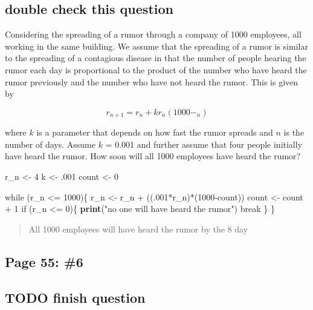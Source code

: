 \documentclass[]{article}
\newenvironment{Shaded}{\begin{snugshade}}{\end{snugshade}}
\newcommand{\KeywordTok}[1]{\textcolor[rgb]{0.13,0.29,0.53}{\textbf{{#1}}}}
\newcommand{\DecValTok}[1]{\textcolor[rgb]{0.00,0.00,0.81}{{#1}}}
\newcommand{\StringTok}[1]{\textcolor[rgb]{0.31,0.60,0.02}{{#1}}}
\newcommand{\NormalTok}[1]{{#1}}
\begin{document}
\subsection{double check this
question}\label{double-check-this-question}

Considering the spreading of a rumor through a company of 1000
employees, all working in the same building. We assume that the
spreading of a rumor is similar to the spreading of a contagious disease
in that the number of people hearing the rumor each day is proportional
to the product of the number who have heard the rumor previously and the
number who have not heard the rumor. This is given by

\[r_{n+1} = r_n + kr_n(1000- _n)\]

where \(k\) is a parameter that depends on how fast the rumor spreads
and \(n\) is the number of days. Assume \(k\) = 0.001 and further assume
that four people initially have heard the rumor. How soon will all 1000
employees have heard the rumor?

\begin{Shaded}
\begin{Highlighting}[]
\NormalTok{r_n <-}\StringTok{ }\DecValTok{4}
\NormalTok{k <-}\StringTok{ }\NormalTok{.}\DecValTok{001}
\NormalTok{count <-}\StringTok{ }\DecValTok{0}

\NormalTok{while (r_n <=}\StringTok{ }\DecValTok{1000}\NormalTok{)\{}
\NormalTok{r_n <-}\StringTok{ }\NormalTok{r_n +}\StringTok{ }\NormalTok{((.}\DecValTok{001}\NormalTok{*r_n)*(}\DecValTok{1000}\NormalTok{-count))}
\NormalTok{count <-}\StringTok{ }\NormalTok{count +}\StringTok{ }\DecValTok{1}
\NormalTok{if (r_n <=}\StringTok{ }\DecValTok{0}\NormalTok{)\{}
  \KeywordTok{print}\NormalTok{(}\StringTok{"no one will have heard the rumor"}\NormalTok{)}
  \NormalTok{break}
 \NormalTok{\}}
\NormalTok{\}}
\end{Highlighting}
\end{Shaded}

\begin{quote}
All 1000 employees will have heard the rumor by the 8 day
\end{quote}

\subsection{Page 55: \#6}\label{page-55-6}

\subsection{TODO finish question}\label{todo-finish-question}
\end{document}
